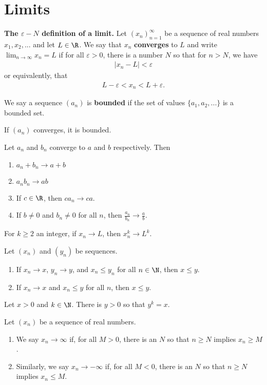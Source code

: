 \documentclass{article}
\begin{document}
\section{Limits}
\begin{definition}
	\textbf{The $\varepsilon-N$ definition of a limit.} Let $(x_n)^\infty_{n=1}$ be a sequence of real numbers $x_1,x_2,...$ and let $L\in\R$. We say that $x_n$ \textbf{converges} to $L$ and write $\lim_{n\to\infty}x_n=L$ if for all $\varepsilon>0$, there is a number $N$ so that for $n>N$, we have
	\begin{align*}
		|x_n-L|<\varepsilon
	\end{align*}
	or equivalently, that
	\begin{align*}
		L-\varepsilon<x_n<L+\varepsilon.
	\end{align*}
\end{definition}
\begin{definition}
	We say a sequence $(a_n)$ is \textbf{bounded} if the set of values $\{a_1, a_2, ...\}$ is a bounded set.
\end{definition}
\begin{theorem}
	If $(a_n)$ converges, it is bounded.
\end{theorem}
\begin{theorem}
	Let $a_n$ and $b_n$ converge to $a$ and $b$ respectively. Then
	\begin{enumerate}
		\item $a_n+b_n\to a+b$
		\item $a_nb_n\to ab$
		\item If $c\in\R$, then $ca_n\to ca$.
		\item If $b\not=0$ and $b_n\not=0$ for all $n$, then $\frac{a_n}{b_n}\to\frac{a}{b}$.
	\end{enumerate}
\end{theorem}
\begin{theorem}
	For $k\geq2$ an integer, if $x_n\to L$, then $x^k_n\to L^k$.
\end{theorem}
\begin{theorem}
	Let $(x_n)$ and $(y_n)$ be sequences.
	\begin{enumerate}
		\item If $x_n\to x$, $y_n\to y$, and $x_n\leq y_n$ for all $n\in\N$, then $x\leq y$.
		\item If $x_n\to x$ and $x_n\leq y$ for all $n$, then $x\leq y$.
	\end{enumerate}
\end{theorem}
\begin{theorem}
	Let $x>0$ and $k\in\N$. There is $y>0$ so that $y^k=x$.
\end{theorem}
\begin{definition}
	Let $(x_n)$ be a sequence of real numbers.
	\begin{enumerate}
		\item We say $x_n\to \infty$ if, for all $M>0$, there is an $N$ so that $n\geq N$ implies $x_n\geq M$.
		\item Similarly, we say $x_n\to-\infty$ if, for all $M<0$, there is an $N$ so that $n\geq N$ implies $x_n\leq M$.
	\end{enumerate}
\end{definition}
\end{document}
